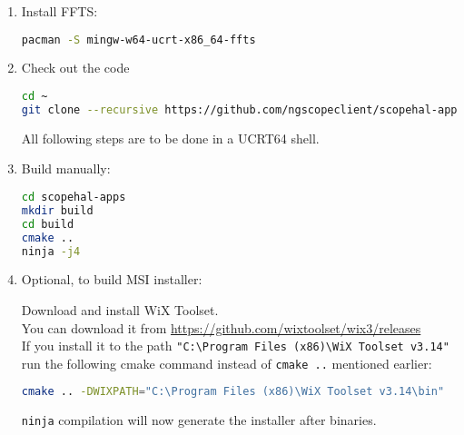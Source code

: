 \begin{enumerate}
\item Install FFTS:
\begin{lstlisting}[language=sh, numbers=none]
pacman -S mingw-w64-ucrt-x86_64-ffts
\end{lstlisting}

\item Check out the code

\begin{lstlisting}[language=sh, numbers=none]
cd ~
git clone --recursive https://github.com/ngscopeclient/scopehal-apps
\end{lstlisting}

All following steps are to be done in a UCRT64 shell.

\item Build manually:
\begin{lstlisting}[language=sh, numbers=none]
cd scopehal-apps
mkdir build
cd build
cmake ..
ninja -j4
\end{lstlisting}

\item Optional, to build MSI installer:

Download and install WiX Toolset.\\
You can download it from \href{https://github.com/wixtoolset/wix3/releases}{https://github.com/wixtoolset/wix3/releases}\\
If you install it to the path \texttt{"C:\textbackslash Program Files (x86)\textbackslash WiX Toolset v3.14"} run the following cmake command instead of \texttt{cmake ..} mentioned earlier:

\begin{lstlisting}[language=sh, numbers=none]
cmake .. -DWIXPATH="C:\Program Files (x86)\WiX Toolset v3.14\bin"
\end{lstlisting}

\texttt{ninja} compilation will now generate the installer after binaries.







\end{enumerate}
